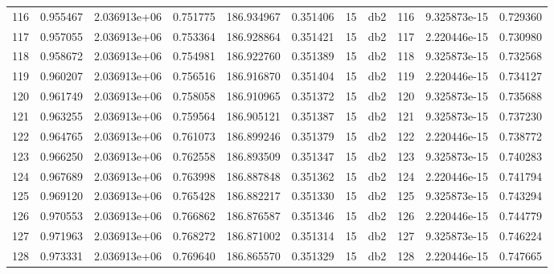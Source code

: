 \begin{tabular}{lrrrrrrlrrr}
116  &    0.955467 &        2.036913e+06 &  0.751775 &              186.934967 &    0.351406 &      15 &          db2 &    116 &   9.325873e-15 &      0.729360 \\
117  &    0.957055 &        2.036913e+06 &  0.753364 &              186.928864 &    0.351421 &      15 &          db2 &    117 &   2.220446e-15 &      0.730980 \\
118  &    0.958672 &        2.036913e+06 &  0.754981 &              186.922760 &    0.351389 &      15 &          db2 &    118 &   9.325873e-15 &      0.732568 \\
119  &    0.960207 &        2.036913e+06 &  0.756516 &              186.916870 &    0.351404 &      15 &          db2 &    119 &   2.220446e-15 &      0.734127 \\
120  &    0.961749 &        2.036913e+06 &  0.758058 &              186.910965 &    0.351372 &      15 &          db2 &    120 &   9.325873e-15 &      0.735688 \\
121  &    0.963255 &        2.036913e+06 &  0.759564 &              186.905121 &    0.351387 &      15 &          db2 &    121 &   9.325873e-15 &      0.737230 \\
122  &    0.964765 &        2.036913e+06 &  0.761073 &              186.899246 &    0.351379 &      15 &          db2 &    122 &   2.220446e-15 &      0.738772 \\
123  &    0.966250 &        2.036913e+06 &  0.762558 &              186.893509 &    0.351347 &      15 &          db2 &    123 &   9.325873e-15 &      0.740283 \\
124  &    0.967689 &        2.036913e+06 &  0.763998 &              186.887848 &    0.351362 &      15 &          db2 &    124 &   2.220446e-15 &      0.741794 \\
125  &    0.969120 &        2.036913e+06 &  0.765428 &              186.882217 &    0.351330 &      15 &          db2 &    125 &   9.325873e-15 &      0.743294 \\
126  &    0.970553 &        2.036913e+06 &  0.766862 &              186.876587 &    0.351346 &      15 &          db2 &    126 &   2.220446e-15 &      0.744779 \\
127  &    0.971963 &        2.036913e+06 &  0.768272 &              186.871002 &    0.351314 &      15 &          db2 &    127 &   9.325873e-15 &      0.746224 \\
128  &    0.973331 &        2.036913e+06 &  0.769640 &              186.865570 &    0.351329 &      15 &          db2 &    128 &   2.220446e-15 &      0.747665 \\

\end{tabular}
